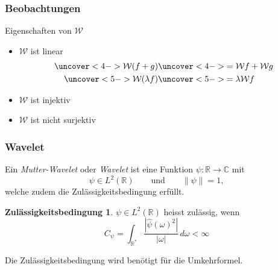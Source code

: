 {\begin{frame}
\begin{center}
\end{center}
\end{frame}
}

%
%
\begin{frame}
\frametitle{Beobachtungen}
Eigenschaften von $\mathcal{W}$
\begin{itemize}
\item<2->
$\mathcal W$ ist linear
\begin{align*}
\uncover<4->{\mathcal{W}(f+g)} &\uncover<4->{= \mathcal{W}f + \mathcal{W}g}
\\
\uncover<5->{\mathcal{W}(\lambda f)} &\uncover<5->{= \lambda \mathcal{W}f}
\end{align*}
\item<6->
$\mathcal W$ ist injektiv 
\item<8->
$\mathcal W$ ist nicht surjektiv
\end{itemize}
\end{frame}

%
%
\begin{frame}
\frametitle{Wavelet}
\begin{definition}
Ein {\em Mutter-Wavelet} oder {\em Wavelet} ist eine Funktion
$\psi\colon\mathbb R\to\mathbb C$ mit
\[
\psi\in L^2(\mathbb R)
\qquad\text{und}\qquad
\|\psi\|=1,
\]
welche zudem die Zulässigkeitsbedingung erfüllt.
\end{definition}

\theoremstyle{definition}
\newtheorem{zulassig}{Zulässigkeitsbedingung}
\begin{zulassig}
$\psi\in L^2(\mathbb R)$ heisst zulässig, wenn
\[
C_{\psi}
=
\int_{\mathbb R^*} \frac{|\hat{\psi}(\omega)^2|}{|\omega|}\,d\omega
<
\infty
\]
\end{zulassig}
Die Zulässigkeitsbedingung wird benötigt für die Umkehrformel.
\end{frame}
